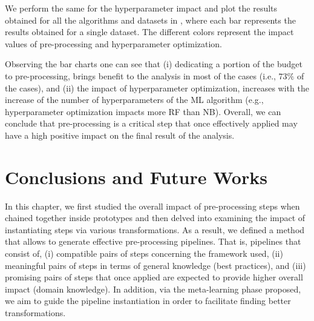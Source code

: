 We perform the same for the hyperparameter impact and plot the results obtained for all the algorithms and datasets in , where each bar represents the results obtained for a single dataset.
The different colors represent the impact values of pre-processing and hyperparameter optimization.

Observing the bar charts one can see that (i) dedicating a portion of the budget to pre-processing, brings benefit to the analysis in most of the cases (i.e., $73\%$ of the cases), and (ii) the impact of hyperparameter optimization, increases with the increase of the number of hyperparameters of the ML algorithm (e.g., hyperparameter optimization impacts more RF than NB).
Overall, we can conclude that pre-processing is a critical step that once effectively applied may have a high positive impact on the final result of the analysis.

\section{Conclusions and Future Works}
\label{effective-sec:conclusions}

In this chapter, we first studied the overall impact of pre-processing steps when chained together inside prototypes and then delved into examining the impact of instantiating steps via various transformations.
As a result, we defined a method that allows to generate effective pre-processing pipelines.
That is, pipelines that consist of, (i) compatible pairs of steps concerning the framework used,  (ii) meaningful pairs of steps in terms of general knowledge (best practices), and (iii) promising pairs of steps that once applied are expected to provide higher overall impact (domain knowledge).
In addition, via the meta-learning phase proposed, we aim to guide the pipeline instantiation in order to facilitate finding better transformations.

